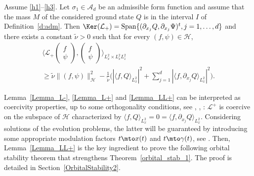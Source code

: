 \begin{lemma}\label{Lemma_LL+}
Assume \eqref{h1}--\eqref{h3}. Let $\sigma_{1}\in\mathscr{A}_{d}$ be an admissible form function and assume that the mass $M$ of the considered ground state $Q$ is in the interval $I$ of Definition~\ref{d:adm}. Then $\Ker(\mathcal{L}_{+})=\mathrm{Span}\{(\partial_{x_{j}}Q,\partial_{x_{j}}\Psi)^{t}, j=1,\ldots,d\}$ and there exists a constant $\tilde{\nu}>0$ such that for every $(f,\psi)\in\mathscr {H}$,
\begin{multline}\label{coercivity3}
\biggl\langle\mathcal{L}_{+}\begin{pmatrix} f\\\psi \end{pmatrix},\begin{pmatrix} f\\\psi \end{pmatrix}\biggr\rangle_{L_{x}^{2}\times L_{x}^{2}L_{z}^{2}}\\[
-5pt]
\geq\tilde{\nu}\|(f,\psi)\|_{\mathscr {H}}^{2}-\frac{1}{\tilde{\nu}}\biggl(\left|\langle f,Q\rangle_{L_{x}^{2}}\right|^{2}+\sum\limits_{j=1}^{d}\left|\langle f,\partial_{x_{j}}Q\rangle_{L_{x}^{2}}\right|^{2}\biggr).
\end{multline}
\end{lemma}

Lemma~\ref{Lemma_L-}, \ref{Lemma_L+} and \ref{Lemma_LL+}
can be interpreted as coercivity properties, up to
some orthogonality conditions, see \cite[\S 4]{Tao}, \cite[Prop.\,2.8 \& 2.9]{Weinstein1}, \cite[Eq.\,(2.14)]{Avenia_Squassina}:
$\mathcal L^+$ is coercive on
the subspace of $\mathscr H$ characterized by
$\langle f,Q\rangle_{L_{x}^{2}}=0=\langle f,\partial_{x_{j}}Q\rangle_{L_{x}^{2}}$.
Considering solutions of
the evolution problems, the latter will
be guaranteed by introducing some appropriate modulation factors $t\mto x(t)$ and $t\mto \gamma(t)$, see \cite [sp.\,\S3]{Weinstein2}. Then,
Lemma~\ref{Lemma_LL+}
is the key ingredient to prove the following orbital stability theorem that strengthens
Theorem~\ref{orbital_stab_1}. The proof is detailed in Section~\ref{OrbitalStability2}.

